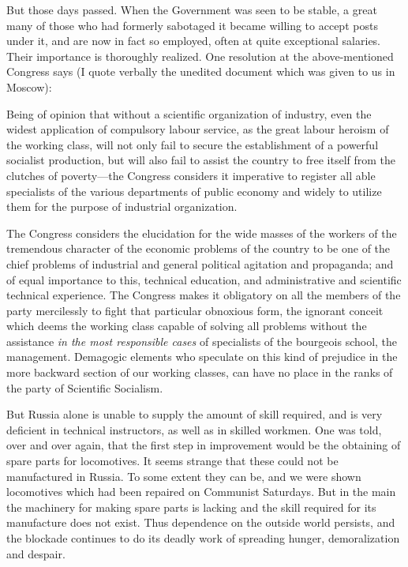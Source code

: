 But those days passed. When the Government was seen to be stable, a great many of those who had formerly sabotaged it became willing to accept posts under it, and are now in fact so employed, often at quite exceptional salaries. Their importance is thoroughly realized. One resolution at the above-mentioned Congress says (I quote verbally the unedited document which was given to us in Moscow):

\begin{displayquote}
Being of opinion that without a scientific organization of industry, even the widest application of compulsory labour service, as the great labour heroism of the working class, will not only fail to secure the establishment of a powerful socialist production, but will also fail to assist the country to free itself from the clutches of poverty---the Congress considers it imperative to register all able specialists of the various departments of public economy and widely to utilize them for the purpose of industrial organization.

The Congress considers the elucidation for the wide masses of the workers of the tremendous character of the economic problems of the country to be one of the chief problems of industrial and general political agitation and propaganda; and of equal importance to this, technical education, and administrative and scientific technical experience. The Congress makes it obligatory on all the members of the party mercilessly to fight that particular obnoxious form, the ignorant conceit which deems the working class capable of solving all problems without the assistance \emph{in the most responsible cases} of specialists of the bourgeois school, the management. Demagogic elements who speculate on this kind of prejudice in the more backward section of our working classes, can have no place in the ranks of the party of Scientific Socialism.
\end{displayquote}

But Russia alone is unable to supply the amount of skill required, and is very deficient in technical instructors, as well as in skilled workmen. One was told, over and over again, that the first step in improvement would be the obtaining of spare parts for locomotives. It seems strange that these could not be manufactured in Russia. To some extent they can be, and we were shown locomotives which had been repaired on Communist Saturdays. But in the main the machinery for making spare parts is lacking and the skill required for its manufacture does not exist. Thus dependence on the outside world persists, and the blockade continues to do its deadly work of spreading hunger, demoralization and despair.

